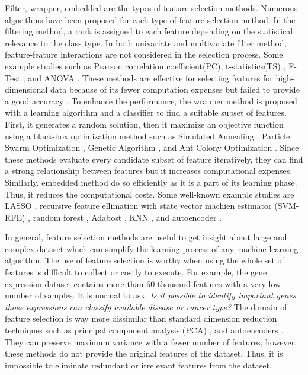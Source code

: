 \documentclass{bioinfo}
\begin{document}
Filter, wrapper, embedded are the types of feature selection methods. Numerous algorithms have been proposed for each type of feature selection method. 
In the filtering method, a rank is assigned to each feature depending on the statistical relevance to the class type. In both univariate and multivariate filter method, feature-feature interactions are not considered in the selection process. Some example studies such as Pearson correlation coefficient(PC), t-statistics(TS) \citep{speed2003statistical}, F-Test \citep{ding2005minimum}, and ANOVA \citep{ding2015identification}. These methods are effective for selecting features for high-dimensional data because of its fewer computation expenses but failed to provide a good accuracy \citep{sun2018cross}. 
To enhance the performance, the wrapper method is proposed with a learning algorithm and a classifier to find a suitable subset of features. First, it generates a random solution, then it maximize an objective function using a black-box optimization method \citep{rau2019exploring} such as Simulated Annealing \citep{jeong2018feature}, Particle Swarm Optimization \citep{xue2012particle}, Genetic Algorithm \citep{wu2011feature}, and Ant Colony Optimization \citep{kabir2012new}. Since these methods evaluate every candidate subset of feature iteratively, they can find a strong relationship between features but it increases computational expenses. 
Similarly, embedded method do so efficiently as it is a part of its learning phase. Thus, it reduces the computational costs. Some well-known example studies are  LASSO \citep{tibshirani1996regression}, recursive feature ellimation with state vector machien estimator (SVM-RFE) \citep{abdullah2019, guyon2002gene, fang2019tightly}, random forest \citep{pouyan2018random, ram2017classification}, Adabost \citep{wang2012adaboost}, KNN \citep{le2019statistical}, and autoencoder \citep{lu2019autoencoder}.

In general, feature selection methods are useful to get insight about large and complex dataset which can simplify the learning process of any machine learning algorithm. The use of feature selection is worthy when using the whole set of features is difficult to collect or costly to execute. For example, the gene expression dataset contains more than 60 thousand features with a very low number of samples. It is normal to ask: \textit{Is it possible to identify important genes those expressions can classify available disease or cancer type?} The domain of feature selection is way more dissimilar than standard dimension reduction techniques such as principal component analysis (PCA) \citep{hotelling1933analysis}, and autoencoders \citep{hinton2006reducing}. They can preserve maximum variance with a fewer number of features, however, these methods do not provide the original features of the dataset. Thus, it is impossible to eliminate redundant or irrelevant features from the dataset. 
\end{document}
